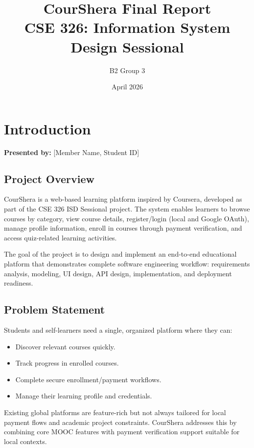 \documentclass[12pt,a4paper]{report}
\title{CourShera Final Report\\CSE 326: Information System Design Sessional}
\author{B2 Group 3}
\date{April 2026}
\begin{document}
\maketitle
\tableofcontents
\clearpage

\chapter{Introduction}

\textbf{Presented by:} [Member Name, Student ID]

\section{Project Overview}
CourShera is a web-based learning platform inspired by Coursera, developed as part of the CSE 326 ISD Sessional project. The system enables learners to browse courses by category, view course details, register/login (local and Google OAuth), manage profile information, enroll in courses through payment verification, and access quiz-related learning activities.

The goal of the project is to design and implement an end-to-end educational platform that demonstrates complete software engineering workflow: requirements analysis, modeling, UI design, API design, implementation, and deployment readiness.

\section{Problem Statement}
Students and self-learners need a single, organized platform where they can:
\begin{itemize}[leftmargin=*]
  \item Discover relevant courses quickly.
  \item Track progress in enrolled courses.
  \item Complete secure enrollment/payment workflows.
  \item Manage their learning profile and credentials.
\end{itemize}

Existing global platforms are feature-rich but not always tailored for local payment flows and academic project constraints. CourShera addresses this by combining core MOOC features with payment verification support suitable for local contexts.
\end{document}
